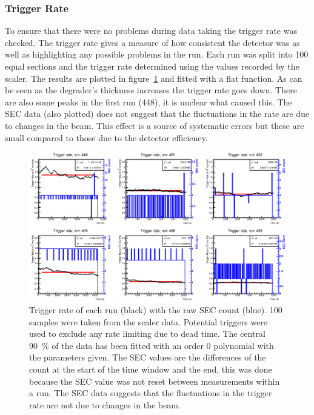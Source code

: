 \subsubsection{Trigger Rate} %
\label{sub:gain_stability}
To ensure that there were no problems during data taking the trigger rate was checked. The trigger rate gives a measure of how consistent the detector was as well as highlighting any possible problems in the run. Each run was split into 100 equal sections and the trigger rate determined using the values recorded by the scaler. The results are plotted in figure~\ref{fig:gain_stability} and fitted with a flat function. As can be seen as the degrader's thickness increases the trigger rate goes down. There are also some peaks in the first run (448), it is unclear what caused this. The SEC data (also plotted) does not suggest that the fluctuations in the rate are due to changes in the beam. This effect is a source of systematic errors but these are small compared to those due to the detector efficiency.
%
\begin{figure}
      \centering
          \includegraphics[width=\textwidth]{images/momentum_spectrum/gain_stability.eps}
      \caption{Trigger rate of each run (black) with the raw SEC count (blue). 100 samples were taken from the scaler data. Potential triggers were used to exclude any rate limiting due to dead time. The central 90~\% of the data has been fitted with an order 0 polynomial with the parameters given. The SEC values are the differences of the count at the start of the time window and the end, this was done because the SEC value was not reset between measurements within a run. The SEC data suggests that the fluctuations in the trigger rate are not due to changes in the beam.}
      \label{fig:gain_stability}
\end{figure}

